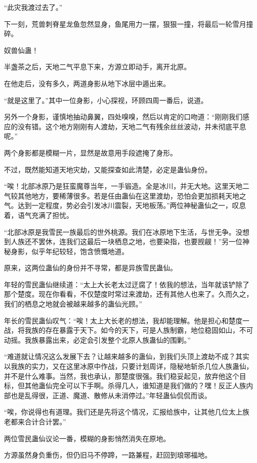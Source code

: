 \begin{this_body}
“此灾我渡过去了。”

下一刻，荒兽刺脊星龙鱼忽然显身，鱼尾用力一摆，狠狠一撞，将最后一轮雪月撞碎。

奴兽仙蛊！

半盏茶之后，天地二气平息下来，方源立即动手，离开北原。

在他走后，没有多久，两道身影从地下冰层中遁出来。

“就是这里了。”其中一位身影，小心探视，环顾四周一番后，说道。

另外一个身影，谨慎地抽动鼻翼，四处嗅嗅，然后以肯定的口吻道：“刚刚我们感应的没有错。这个地方刚刚有人渡劫，天地二气有残余丝丝波动，并未彻底平息呢。”

两个身影都是模糊一片，显然是故意用手段遮掩了身形。

不过，既然能知道天地灾劫，又能探查如此清楚，必定是蛊仙身份。

“唉！北部冰原乃是狂蛮魔尊当年，一手锻造。全是冰川，并无大地。这里天地二气较其他地方，要稀薄很多。若是任由蛊仙在这里渡劫，恐怕会更加损耗天地之气。达到一定程度，势必会引发冰川震裂，天地板荡。”两位神秘蛊仙之一，叹息着，语气充满了担忧。

“北部冰原是我雪民一族最后的世外桃源。我们在冰原地下生活，与世无争。没想到人族还不罢休，连我们这最后一块栖息之地，也要染指，也要觊觎！”另一位神秘身影，似乎年纪较轻，饱含愤慨地道。

原来，这两位蛊仙的身份并不寻常，都是异族雪民蛊仙。

年轻的雪民蛊仙继续道：“太上大长老太过迂腐了！依我的想法，当年就该铲除了那个楚度。现在你看看，不仅楚度时常过来渡劫，还有其他人也来了。久而久之，我们的栖息之地就会被越来越多的蛊仙光顾。”

年长的雪民蛊仙叹气：“唉！太上大长老的想法，我却能理解。他是担心和楚度一战，将我族的存在暴露于天下。如今的天下，可是人族制霸，地位稳固如山，不可动摇。我族暴露出来，必定会引发整个北原人族蛊仙的围剿。”

“难道就让情况这么发展下去？让越来越多的蛊仙，到我们头顶上渡劫不成？其实以我族的实力，又在这里冰原中作战，只要计划周详，隐秘地斩杀几位人族蛊仙，并不是什么难事。当然，我也承认，那楚度很强。我们稳妥起见，放弃他这个目标，但其他蛊仙完全可以下手啊。杀得几人，谁知道是我们做的？嘿！反正人族内部也是乱得很，正道、魔道、散修从未消停过。”年轻蛊仙侃侃而谈。

“唉，你说得也有道理。我们还是先将这个情况，汇报给族中，让其他几位太上族老都来合计合计罢。”

两位雪民蛊仙议论一番，模糊的身影悄然消失在原地。

方源虽然身负重伤，但仍旧马不停蹄，一路兼程，赶回到琅琊福地。


\end{this_body}
